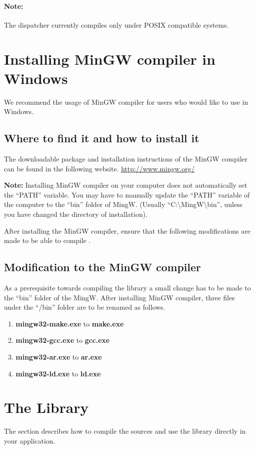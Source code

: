 \paragraph{Note:}
The dispatcher currently compiles only under POSIX compatible systems. 

\section*{Installing MinGW compiler in Windows}
We recommend the usage of MinGW compiler for users who would like to use \libalf in Windows. 

\subsection*{Where to find it and how to install it}
The downloadable package and installation instructions of the MinGW compiler can be found in the following website.
\url{http://www.mingw.org/} \vskip 1pt

\textbf{Note:} Installing MinGW compiler on your computer does not automatically set the ``PATH'' variable. You may have to manually update the ``PATH'' variable of the computer to the ``bin'' folder of MingW. (Usually ``C:\textbackslash MingW\textbackslash bin'', unless you have changed the directory of installation). 

After installing the MinGW compiler, ensure that the following modifications are made to be able to compile \libalf.

\subsection*{Modification to the MinGW compiler}

As a prerequisite towards compiling the library a small change has to be made to the ``bin'' folder of the MingW.   
After installing MinGW compiler, three files under the ``/bin'' folder are to be renamed as follows.
\begin{enumerate}
 \item \textbf{mingw32-make.exe} to \textbf{make.exe}
 \item \textbf{mingw32-gcc.exe} to \textbf{gcc.exe}
 \item \textbf{mingw32-ar.exe} to \textbf{ar.exe}
 \item \textbf{mingw32-ld.exe} to \textbf{ld.exe}	
\end{enumerate}
 
\section{The \libalf \cpp Library}
The section describes how to compile the sources and use the \cpp library directly in your application.
